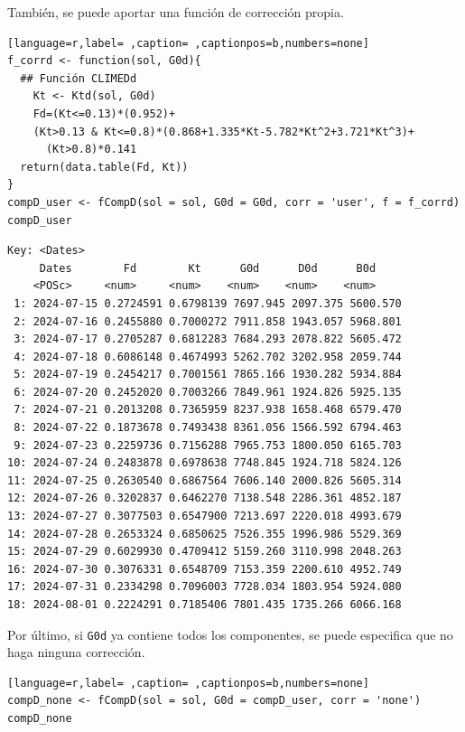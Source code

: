 \begin{itemize}
También, se puede aportar una función de corrección propia.
\begin{lstlisting}[language=r,label= ,caption= ,captionpos=b,numbers=none]
f_corrd <- function(sol, G0d){
  ## Función CLIMEDd
    Kt <- Ktd(sol, G0d)
    Fd=(Kt<=0.13)*(0.952)+
    (Kt>0.13 & Kt<=0.8)*(0.868+1.335*Kt-5.782*Kt^2+3.721*Kt^3)+
      (Kt>0.8)*0.141
  return(data.table(Fd, Kt))
}
compD_user <- fCompD(sol = sol, G0d = G0d, corr = 'user', f = f_corrd)
compD_user
\end{lstlisting}

\begin{verbatim}
Key: <Dates>
	 Dates        Fd        Kt      G0d      D0d      B0d
	<POSc>     <num>     <num>    <num>    <num>    <num>
 1: 2024-07-15 0.2724591 0.6798139 7697.945 2097.375 5600.570
 2: 2024-07-16 0.2455880 0.7000272 7911.858 1943.057 5968.801
 3: 2024-07-17 0.2705287 0.6812283 7684.293 2078.822 5605.472
 4: 2024-07-18 0.6086148 0.4674993 5262.702 3202.958 2059.744
 5: 2024-07-19 0.2454217 0.7001561 7865.166 1930.282 5934.884
 6: 2024-07-20 0.2452020 0.7003266 7849.961 1924.826 5925.135
 7: 2024-07-21 0.2013208 0.7365959 8237.938 1658.468 6579.470
 8: 2024-07-22 0.1873678 0.7493438 8361.056 1566.592 6794.463
 9: 2024-07-23 0.2259736 0.7156288 7965.753 1800.050 6165.703
10: 2024-07-24 0.2483878 0.6978638 7748.845 1924.718 5824.126
11: 2024-07-25 0.2630540 0.6867564 7606.140 2000.826 5605.314
12: 2024-07-26 0.3202837 0.6462270 7138.548 2286.361 4852.187
13: 2024-07-27 0.3077503 0.6547900 7213.697 2220.018 4993.679
14: 2024-07-28 0.2653324 0.6850625 7526.355 1996.986 5529.369
15: 2024-07-29 0.6029930 0.4709412 5159.260 3110.998 2048.263
16: 2024-07-30 0.3076331 0.6548709 7153.359 2200.610 4952.749
17: 2024-07-31 0.2334298 0.7096003 7728.034 1803.954 5924.080
18: 2024-08-01 0.2224291 0.7185406 7801.435 1735.266 6066.168
\end{verbatim}

Por último, si \texttt{G0d} ya contiene todos los componentes, se puede especifica que no haga ninguna corrección.
\begin{lstlisting}[language=r,label= ,caption= ,captionpos=b,numbers=none]
compD_none <- fCompD(sol = sol, G0d = compD_user, corr = 'none')
compD_none
\end{lstlisting}


\end{itemize}
